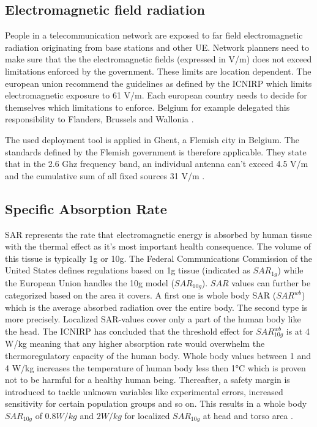 \subsection{Electromagnetic field radiation} %
\label{sub:emf}
People in a telecommunication network are exposed to far field electromagnetic radiation originating from base stations and other \gls{UE}. 
Network planners need to make sure that the the electromagnetic fields (expressed in V/m) does not exceed limitations enforced 
by the government. These limits are location dependent. The european union recommend the guidelines as defined by the \gls{ICNIRP} which limits electromagnetic exposure to 61 V/m.
Each european country needs to decide for themselves which limitations to enforce. Belgium for example delegated this responsibility to Flanders, Brussels and Wallonia \cite{J23}.

The used deployment tool is applied in Ghent, a Flemish city in Belgium. The standards defined by the Flemish government is therefore applicable.
They state that in the 2.6 Ghz frequency band, an individual antenna can't exceed 4.5 V/m and the cumulative sum of all fixed sources 31 V/m \cite{S13_normenBelgie}.

\subsection{Specific Absorption Rate}

\gls{SAR} represents the rate that electromagnetic energy is absorbed by human tissue with the thermal effect as it's most important health consequence.
The volume of this tissue is typically 1g or 10g. The Federal Communications Commission of the United States defines regulations based on 1g tissue (indicated as $SAR_{1g}$) 
while the European Union handles the 
10g model ($SAR_{10g}$). $SAR$ values can further be categorized based on the area it covers. 
A first one is whole body \gls{SAR} ($SAR^{wb}$) which is the average absorbed radiation over the entire 
body. The second type is more precisely. Localized \gls{SAR}-values cover only  a part of the human body like the head.
The \gls{ICNIRP} has concluded that the threshold effect for $SAR^{wb}_{10g}$ is at 4 W/kg meaning that any higher absorption rate would overwhelm the thermoregulatory capacity of the human body.
Whole body values between 1 and 4 W/kg increases the temperature of human body less then 1°C which is proven not to be harmful for a healthy human being\cite{J24}.
Thereafter, a safety margin is introduced to tackle unknown variables like experimental errors, increased sensitivity for certain population groups and so on. 
This results in a whole body $SAR_{10g}$ of $0.8 W/kg$ and $2 W/kg$ for localized $SAR_{10g}$ at head and torso area \cite{J23}.

